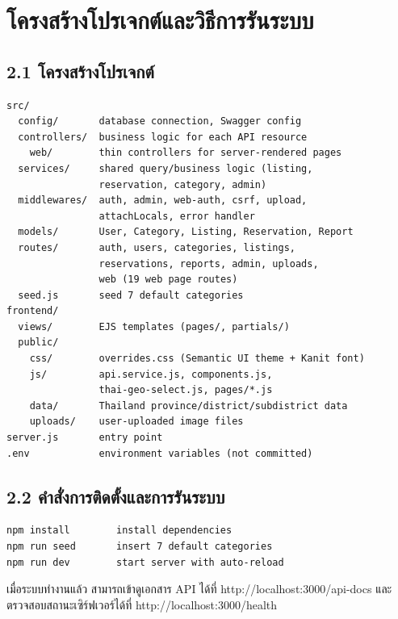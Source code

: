 \documentclass[12pt,a4paper]{report}
\begin{document}
\chapter{โครงสร้างโปรเจกต์และวิธีการรันระบบ}

\noindent\begin{minipage}{\linewidth}
\section*{2.1 โครงสร้างโปรเจกต์}

\begin{lstlisting}
src/
  config/       database connection, Swagger config
  controllers/  business logic for each API resource
    web/        thin controllers for server-rendered pages
  services/     shared query/business logic (listing,
                reservation, category, admin)
  middlewares/  auth, admin, web-auth, csrf, upload,
                attachLocals, error handler
  models/       User, Category, Listing, Reservation, Report
  routes/       auth, users, categories, listings,
                reservations, reports, admin, uploads,
                web (19 web page routes)
  seed.js       seed 7 default categories
frontend/
  views/        EJS templates (pages/, partials/)
  public/
    css/        overrides.css (Semantic UI theme + Kanit font)
    js/         api.service.js, components.js,
                thai-geo-select.js, pages/*.js
    data/       Thailand province/district/subdistrict data
    uploads/    user-uploaded image files
server.js       entry point
.env            environment variables (not committed)
\end{lstlisting}
\end{minipage}

\noindent\begin{minipage}{\linewidth}
\section*{2.2 คำสั่งการติดตั้งและการรันระบบ}

\begin{lstlisting}
npm install        install dependencies
npm run seed       insert 7 default categories
npm run dev        start server with auto-reload
\end{lstlisting}
\end{minipage}

เมื่อระบบทำงานแล้ว สามารถเข้าดูเอกสาร API ได้ที่ http://localhost:3000/api-docs และตรวจสอบสถานะเซิร์ฟเวอร์ได้ที่ http://localhost:3000/health
\end{document}
